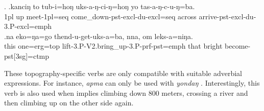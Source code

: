 \ex. \ag.kanciŋ  to  tub-i=hoŋ          uks-a-ŋ-ci-ŋ=hoŋ                       yo      tas-a-ŋ-c-u-ŋ=ba.\\
{\sc 1pl} up meet{\sc -1pl=seq} come\_down{\sc -pst-excl-du-excl=seq} across arrive{\sc -pst-excl-du-3.P-excl=emph}\\
 
\bg.na   eko=ŋa=go       thend-u-get-uks-a=ba,     nna, om     leks-a=niŋa.\\
this one{\sc =erg=top} lift{\sc -3.P-V2.bring\_up-3.P-prf-pst=emph} that bright become{\sc -pst[3sg]=ctmp}\\
 


These topography-specific verbs are only compatible with suitable adverbial expressions. For instance, \emph{apma}  can only be used with \emph{yondaŋ}  . Interestingly, this verb is also used when  implies climbing down 800 meters, crossing a river and then climbing up on the other side again.

